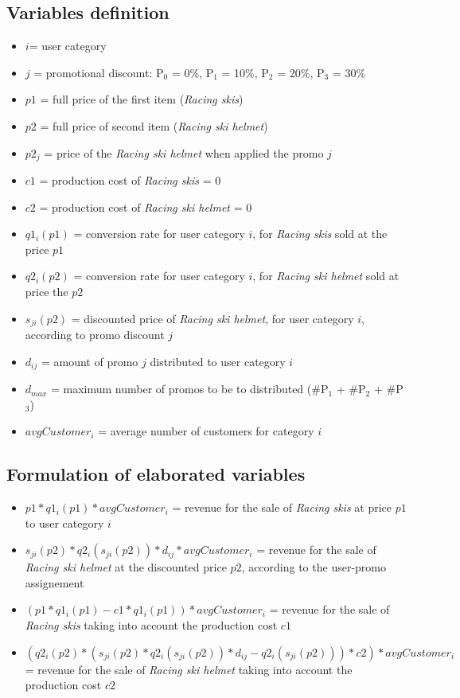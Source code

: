 \subsection*{Variables definition}
\begin{itemize}
\item $i$= user category 
\item $j$ = promotional discount: P$_0$ = 0\%, P$_1$ = 10\%, P$_2$ = 20\%, P$_3$ = 30\%
\item $p1$ = full price of the first item (\textit{Racing skis}) 
\item $p2$ = full price of second item (\textit{Racing ski helmet})
\item $p2_j$ = price of the \textit{Racing ski helmet} when applied the promo $j$
\item $c1$ = production cost of \textit{Racing skis} = 0
\item $c2$ = production cost of \textit{Racing ski helmet} = 0
\item $q1_i(p1)$ = conversion rate for user category $i$, for \textit{Racing skis} sold at the price $p1$
\item $q2_i(p2)$ = conversion rate for user category $i$, for \textit{Racing ski helmet} sold at price the $p2$
\item $s_{ji}(p2)$ = discounted price of \textit{Racing ski helmet}, for user category $i$, according to promo discount $j$
\item $d_{ij}$ = amount of promo $j$ distributed to user category $i$
\item $d_{max}$ = maximum number of promos to be to distributed (\#P$_1$ + \#P$_2$ + \#P$_3$)
\item $avgCustomer_i$ = average number of customers for category $i$
\end{itemize}


\subsection*{Formulation of elaborated variables}
\begin{itemize}
\item $p1*q1_i(p1)*avgCustomer_i$ = revenue for the sale of \textit{Racing skis} at price $p1$ to user category $i$ 
\item $s_{ji}(p2)*q2_i(s_{ji}(p2))*d_{ij}*avgCustomer_i$  = revenue for the sale of \textit{Racing ski helmet} at the discounted price $p2$, according to the user-promo assignement 
\item $(p1*q1_i(p1)-c1*q1_i(p1))*avgCustomer_i$ = revenue for the sale of \textit{Racing skis} taking into account the production cost $c1$
\item $(q2_i(p2)*(s_{ji}(p2)*q2_i(s_{ji}(p2))*d_{ij}-q2_i(s_{ji}(p2)))*c2)*avgCustomer_i$ = revenue for the sale of \textit{Racing ski helmet} taking into account the production cost $c2$
\end{itemize}

